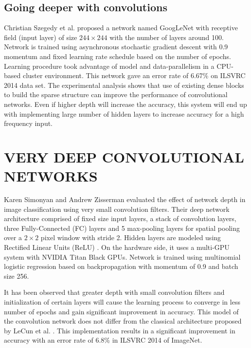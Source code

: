 \documentclass[a4paper]{article}
\begin{document}
\subsection{Going deeper with convolutions }
Christian Szegedy et al. \cite{Szegedy} proposed a network named GoogLeNet with receptive field (input layer) of size $244\times244$ with the number of layers around 100. Network is trained using asynchronous stochastic gradient descent with 0.9 momentum and fixed learning rate schedule based on the number of epochs. Learning procedure took advantage of  model and data-parallelism in a CPU-based cluster environment. This network gave an error rate of  6.67\%  on  ILSVRC 2014 data set. The experimental analysis shows that use of existing dense  blocks to  build the sparse structure can improve the  performance of convolutional networks. Even if higher depth will increase the accuracy, this system will end up with implementing large number of hidden layers to increase accuracy for a high frequency input. 


\section{VERY DEEP CONVOLUTIONAL NETWORKS }
Karen Simonyan and Andrew Zisserman \cite{Arge2015} evaluated the effect of network depth in image classification using very small convolution filters. Their deep network architecture comprised of fixed  size input layers, a stack of convolution layers, three Fully-Connected (FC) layers and  5 max-pooling layers for spatial pooling  over a $2 \times 2$ pixel window with stride 2. Hidden layers are modeled using Rectified Linear Units (ReLU) \cite{Nair2010}. On the hardware side, it uses a multi-GPU system with NVIDIA Titan Black GPUs. Network is trained using multinomial logistic regression  based on backpropagation with momentum of 0.9 and  batch size  256.
\par
It has been observed that greater depth with small convolution filters and  initialization of certain layers will cause the learning process to converge in less number of epochs and gain significant improvement in accuracy. This model of the convolution network does not differ from the classical architecture proposed by LeCun et al. \cite{LeCun1998}. This implementation results in a significant improvement in accuracy with  an error rate of 6.8\% in ILSVRC 2014 of ImageNet.
\end{document}
